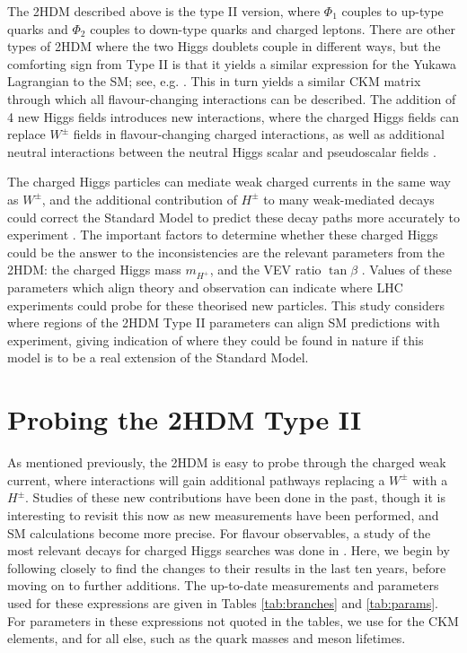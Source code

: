 \documentclass[a4paper,12pt]{article}
\begin{document}
The 2HDM described above is the type II version, where $\Phi_1$ couples to up-type quarks and $\Phi_2$ couples to down-type quarks and charged leptons. 
There are other types of 2HDM where the two Higgs doublets couple in different ways, but the comforting sign from Type II is that it yields a similar expression for the Yukawa Lagrangian to the SM; see, e.g. \cite{hunter}. 
This in turn yields a similar CKM matrix through which all flavour-changing interactions can be described. 
The addition of 4 new Higgs fields introduces new interactions, where the charged Higgs fields can replace $W^\pm$ fields in flavour-changing charged interactions, as well as additional neutral interactions between the neutral Higgs scalar and pseudoscalar fields \cite{branco}. 

The charged Higgs particles can mediate weak charged currents in the same way as $W^{\pm}$, and the additional contribution of $H^{\pm}$ to many weak-mediated decays could correct the Standard Model to predict these decay paths more accurately to experiment \cite{branco}. 
The important factors to determine whether these charged Higgs could be the answer to the inconsistencies are the relevant parameters from the 2HDM: the charged Higgs mass $m_{H^+}$, and the VEV ratio $\tan\beta$ \cite{desc}. 
Values of these parameters which align theory and observation can indicate where LHC experiments could probe for these theorised new particles. 
This study considers where regions of the 2HDM Type II parameters can align SM predictions with experiment, giving indication of where they could be found in nature if this model is to be a real extension of the Standard Model.

\section{Probing the 2HDM Type II}
\label{sec:probe}
As mentioned previously, the 2HDM is easy to probe through the charged weak current, where interactions will gain additional pathways replacing a $W^{\pm}$ with a $H^{\pm}$. 
Studies of these new contributions have been done in the past, though it is interesting to revisit this now as new measurements have been performed, and SM calculations become more precise.
For flavour observables, a study of the most relevant decays for charged Higgs searches was done in \cite{desc}.
Here, we begin by following \cite{desc} closely to find the changes to their results in the last ten years, before moving on to further additions. 
The up-to-date measurements and parameters used for these expressions are given in Tables \ref{tab:branches} and \ref{tab:params}.
For parameters in these expressions not quoted in the tables, we use \cite{ckm} for the CKM elements, and \cite{pdg} for all else, such as the quark masses and meson lifetimes.
\end{document}
